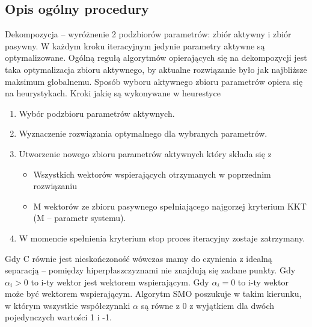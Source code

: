 \documentclass[[10pt,a4paper]{article}
\begin{document}
\subsection{Opis ogólny procedury}
Dekompozycja – wyróżnenie 2 podzbiorów parametrów: zbiór aktywny i zbiór pasywny. W każdym kroku iteracyjnym jedynie parametry aktywne są optymalizowane. Ogólną regułą algorytmów opierających się na dekompozycji jest taka optymalizacja zbioru aktywnego, by aktualne rozwiązanie było jak najbliższe maksimum globalnemu. 
Sposób wyboru aktywnego zbioru parametrów opiera się na heurystykach.
\newline
\newline
Kroki jakię są wykonywane w heurestyce
\begin{enumerate}
\item Wybór podzbioru parametrów aktywnych. 
\item Wyznaczenie rozwiązania optymalnego dla wybranych parametrów.
\item Utworzenie nowego zbioru parametrów aktywnych który składa się z
\begin{itemize}
\item Wszystkich wektorów wspierających otrzymanych w poprzednim rozwiązaniu
\item M wektorów ze zbioru pasywnego spełniającego najgorzej kryterium KKT (M – parametr systemu). 
\end{itemize}
\item W momencie spełnienia kryterium stop proces iteracyjny zostaje zatrzymany. 
\end{enumerate}

Gdy C równie jest nieskończoność wówczas mamy do czynienia z idealną separacją – pomiędzy hiperpłaszczyznami nie znajdują się zadane punkty. 
Gdy $\alpha_{i} > 0 $ to i-ty wektor jest wektorem wspierającym.
Gdy $\alpha_{i} = 0 $ to i-ty wektor może być wektorem wspierającym.
\newline
Algorytm SMO poszukuje w takim kierunku, w którym wszystkie współczynnki $\alpha$ są równe z 0 z wyjątkiem dla dwóch pojedynczych wartości 1 i -1. 
\end{document}
